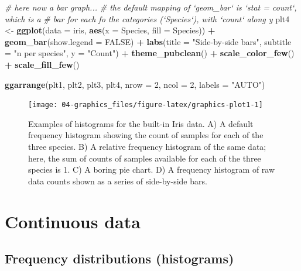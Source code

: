 \documentclass[english,10pt,a4paper,oneside]{book}
\newenvironment{Shaded}{\begin{snugshade}}{\end{snugshade}}
\newcommand{\KeywordTok}[1]{\textcolor[rgb]{0.13,0.29,0.53}{\textbf{#1}}}
\newcommand{\DataTypeTok}[1]{\textcolor[rgb]{0.13,0.29,0.53}{#1}}
\newcommand{\DecValTok}[1]{\textcolor[rgb]{0.00,0.00,0.81}{#1}}
\newcommand{\StringTok}[1]{\textcolor[rgb]{0.31,0.60,0.02}{#1}}
\newcommand{\CommentTok}[1]{\textcolor[rgb]{0.56,0.35,0.01}{\textit{#1}}}
\newcommand{\OtherTok}[1]{\textcolor[rgb]{0.56,0.35,0.01}{#1}}
\newcommand{\OperatorTok}[1]{\textcolor[rgb]{0.81,0.36,0.00}{\textbf{#1}}}
\newcommand{\NormalTok}[1]{#1}
\theoremstyle{definition}
\theoremstyle{definition}
\theoremstyle{definition}
\theoremstyle{remark}
\begin{document}
\begin{Shaded}
\begin{Highlighting}[]
\CommentTok{# here now a bar graph...}
\CommentTok{# the default mapping of `geom_bar` is `stat = count`, which is a}
\CommentTok{# bar for each fo the categories (`Species`), with `count` along y}
\NormalTok{plt4 <-}\StringTok{ }\KeywordTok{ggplot}\NormalTok{(}\DataTypeTok{data =}\NormalTok{ iris, }\KeywordTok{aes}\NormalTok{(}\DataTypeTok{x =}\NormalTok{ Species, }\DataTypeTok{fill =}\NormalTok{ Species)) }\OperatorTok{+}
\StringTok{  }\KeywordTok{geom_bar}\NormalTok{(}\DataTypeTok{show.legend =} \OtherTok{FALSE}\NormalTok{) }\OperatorTok{+}
\StringTok{  }\KeywordTok{labs}\NormalTok{(}\DataTypeTok{title =} \StringTok{"Side-by-side bars"}\NormalTok{, }\DataTypeTok{subtitle =} \StringTok{"n per species"}\NormalTok{, }\DataTypeTok{y =} \StringTok{"Count"}\NormalTok{) }\OperatorTok{+}
\StringTok{ }\KeywordTok{theme_pubclean}\NormalTok{() }\OperatorTok{+}\StringTok{ }\KeywordTok{scale_color_few}\NormalTok{() }\OperatorTok{+}
\StringTok{  }\KeywordTok{scale_fill_few}\NormalTok{()}

\KeywordTok{ggarrange}\NormalTok{(plt1, plt2, plt3, plt4, }\DataTypeTok{nrow =} \DecValTok{2}\NormalTok{, }\DataTypeTok{ncol =} \DecValTok{2}\NormalTok{, }\DataTypeTok{labels =} \StringTok{"AUTO"}\NormalTok{)}
\end{Highlighting}
\end{Shaded}

\begin{figure}
\texttt{[image: 04-graphics\_files/figure-latex/graphics-plot1-1]} \caption{Examples of histograms for the built-in Iris data. A) A default frequency histogram showing the count of samples for each of the three species. B) A relative frequency histogram of the same data; here, the sum of counts of samples available for each of the three species is 1. C) A boring pie chart. D) A frequency histogram of raw data counts shown as a series of side-by-side bars.}\label{fig:graphics-plot1}
\end{figure}

\section{Continuous data}\label{continuous-data-1}

\subsection{Frequency distributions
(histograms)}\label{frequency-distributions-histograms}
\end{document}
